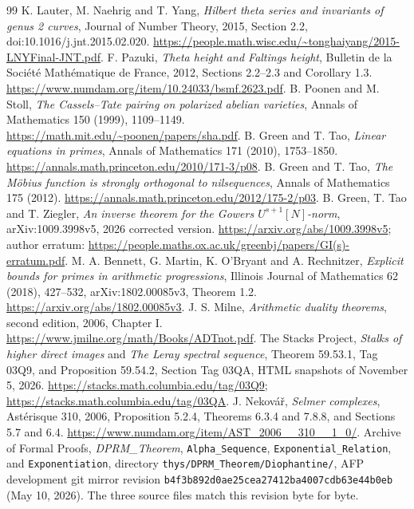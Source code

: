 \documentclass[11pt]{article}
\theoremstyle{definition}
\theoremstyle{remark}
\begin{document}
\begin{thebibliography}{99}
 K. Lauter, M. Naehrig and T. Yang, \emph{Hilbert theta
series and invariants of genus 2 curves}, Journal of Number Theory,
2015, Section 2.2, doi:10.1016/j.jnt.2015.02.020.
\url{https://people.math.wisc.edu/~tonghaiyang/2015-LNYFinal-JNT.pdf}.
 F. Pazuki, \emph{Theta height and Faltings height},
Bulletin de la Soci\'et\'e Math\'ematique de France, 2012,
Sections 2.2--2.3 and Corollary 1.3.
\url{https://www.numdam.org/item/10.24033/bsmf.2623.pdf}.
 B. Poonen and M. Stoll, \emph{The Cassels--Tate
pairing on polarized abelian varieties}, Annals of Mathematics 150
(1999), 1109--1149. \url{https://math.mit.edu/~poonen/papers/sha.pdf}.
 B. Green and T. Tao, \emph{Linear equations in primes},
Annals of Mathematics 171 (2010), 1753--1850.
\url{https://annals.math.princeton.edu/2010/171-3/p08}.
 B. Green and T. Tao, \emph{The M\"obius function is
strongly orthogonal to nilsequences}, Annals of Mathematics 175 (2012).
\url{https://annals.math.princeton.edu/2012/175-2/p03}.
 B. Green, T. Tao and T. Ziegler, \emph{An inverse theorem
for the Gowers $U^{s+1}[N]$-norm}, arXiv:1009.3998v5, 2026 corrected version.
\url{https://arxiv.org/abs/1009.3998v5}; author erratum:
\url{https://people.maths.ox.ac.uk/greenbj/papers/GI(s)-erratum.pdf}.
 M. A. Bennett, G. Martin, K. O'Bryant and A. Rechnitzer,
\emph{Explicit bounds for primes in arithmetic progressions},
Illinois Journal of Mathematics 62 (2018), 427--532,
arXiv:1802.00085v3, Theorem 1.2.
\url{https://arxiv.org/abs/1802.00085v3}.
 J. S. Milne, \emph{Arithmetic duality theorems},
second edition, 2006, Chapter I.
\url{https://www.jmilne.org/math/Books/ADTnot.pdf}.
 The Stacks Project,
\emph{Stalks of higher direct images} and \emph{The Leray spectral sequence},
Theorem 59.53.1, Tag 03Q9, and Proposition 59.54.2, Section Tag 03QA,
HTML snapshots of November 5, 2026.
\url{https://stacks.math.columbia.edu/tag/03Q9};
\url{https://stacks.math.columbia.edu/tag/03QA}.
 J. Nekov\'a\v r, \emph{Selmer complexes},
Ast\'erisque 310, 2006, Proposition 5.2.4, Theorems 6.3.4 and 7.8.8, and Sections 5.7 and 6.4.
\url{https://www.numdam.org/item/AST_2006__310__1_0/}.
 Archive of Formal Proofs, \emph{DPRM\_Theorem},
\texttt{Alpha\_Sequence}, \texttt{Exponential\_Relation}, and
\texttt{Exponentiation}, directory
\texttt{thys/DPRM\_Theorem/Diophantine/}, AFP development git mirror
revision \texttt{b4f3b892d0ae25cea27412ba4007cdb63e44b0eb}
(May 10, 2026). The three source files match this revision byte for byte.

\end{thebibliography}
\end{document}
